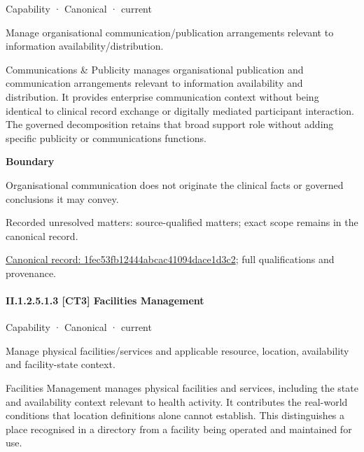 \label{element:1fec53fb12444abcac41094dace1d3c2}
{\small Capability · Canonical · current}\par

Manage organisational communication/publication arrangements relevant to information availability/distribution.



Communications \& Publicity manages organisational publication and communication arrangements relevant to information availability and distribution. It provides enterprise communication context without being identical to clinical record exchange or digitally mediated participant interaction. The governed decomposition retains that broad support role without adding specific publicity or communications functions.



\textbf{Boundary}



Organisational communication does not originate the clinical facts or governed conclusions it may convey.


{\small Recorded unresolved matters: source-qualified matters; exact scope remains in the canonical record.}\par
{\footnotesize \href{../../../../continuum/strategy/capability/1fec53fb12444abcac41094dace1d3c2.md}{Canonical record: 1fec53fb12444abcac41094dace1d3c2}; full qualifications and provenance.}\par
\paragraph*{II.1.2.5.1.3 [CT3] Facilities Management}
\label{navigation:II.1.2.5.1.3}

\label{element:9c82e623bd174409b90d24af6b58ebf0}
{\small Capability · Canonical · current}\par

Manage physical facilities/services and applicable resource, location, availability and facility-state context.



Facilities Management manages physical facilities and services, including the state and availability context relevant to health activity. It contributes the real-world conditions that location definitions alone cannot establish. This distinguishes a place recognised in a directory from a facility being operated and maintained for use.



